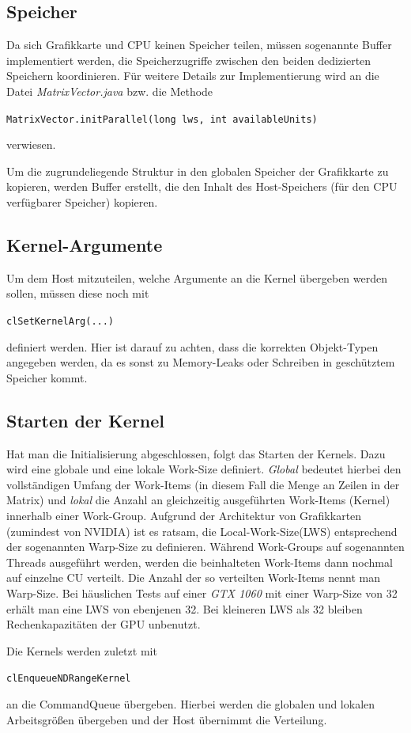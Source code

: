 \documentclass[
	ngerman,
	ruledheaders=section,
	class=report,
	thesis={type=Dokumentation},
	ignore-missing-data=true,
	accentcolor=9c,
	custommargins=false,
	marginpar=false,
	parskip=half-,
	fontsize=11pt,
]{tudapub}
\let\code\texttt
\def\code#1{\begin{small}\texttt{#1}\end{small}}
\begin{document}
\subsection*{Speicher}
Da sich Grafikkarte und CPU keinen Speicher teilen, müssen sogenannte Buffer implementiert werden, die Speicherzugriffe zwischen den beiden dedizierten Speichern koordinieren. Für weitere Details zur Implementierung wird an die Datei \textit{MatrixVector.java} bzw. die Methode \code{MatrixVector.initParallel(long lws, int availableUnits)} verwiesen.

Um die zugrundeliegende Struktur in den globalen Speicher der Grafikkarte zu kopieren, werden Buffer erstellt, die den Inhalt des Host-Speichers (für den CPU verfügbarer Speicher) kopieren.

\subsection*{Kernel-Argumente}
Um dem Host mitzuteilen, welche Argumente an die Kernel übergeben werden sollen, müssen diese noch mit \code{clSetKernelArg(...)} definiert werden. Hier ist darauf zu achten, dass die korrekten Objekt-Typen angegeben werden, da es sonst zu Memory-Leaks oder Schreiben in geschütztem Speicher kommt.

\subsection*{Starten der Kernel}
Hat man die Initialisierung abgeschlossen, folgt das Starten der Kernels. Dazu wird eine globale und eine lokale Work-Size definiert. \textit{Global} bedeutet hierbei den vollständigen Umfang der Work-Items (in diesem Fall die Menge an Zeilen in der Matrix) und \textit{lokal} die Anzahl an gleichzeitig ausgeführten Work-Items (Kernel) innerhalb einer Work-Group. Aufgrund der Architektur von Grafikkarten (zumindest von NVIDIA) ist es ratsam, die Local-Work-Size(LWS) entsprechend der sogenannten Warp-Size zu definieren. Während Work-Groups auf sogenannten Threads ausgeführt werden, werden die beinhalteten Work-Items dann nochmal auf einzelne CU verteilt. Die Anzahl der so verteilten Work-Items nennt man Warp-Size. Bei häuslichen Tests auf einer \textit{GTX 1060} mit einer Warp-Size von 32 erhält man eine LWS von ebenjenen 32. Bei kleineren LWS als 32 bleiben Rechenkapazitäten der GPU unbenutzt.

Die Kernels werden zuletzt mit \code{clEnqueueNDRangeKernel} an die CommandQueue übergeben. Hierbei werden die globalen und lokalen Arbeitsgrößen übergeben und der Host übernimmt die Verteilung.
\end{document}
